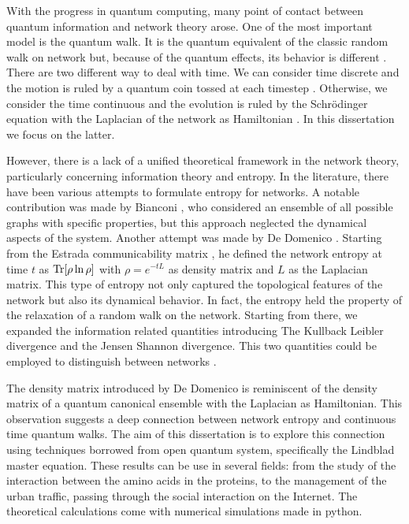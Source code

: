 With the progress in quantum computing, many point of contact between quantum information and network theory arose.
One of the most important model is the quantum walk. It is the quantum equivalent of the classic random walk on network but, because of the quantum effects, its behavior is different \cite{Kempe}. There are two different way to deal with time. We can consider time discrete and the motion is ruled by a quantum coin tossed at each timestep \cite{Coin_quantum_walk}. Otherwise, we consider the time continuous and the evolution is ruled by the Schrödinger equation with the Laplacian of the network as Hamiltonian \cite{Farhi_98}. In this dissertation we focus on the latter.

However, there is a lack of a unified theoretical framework in the network theory, particularly concerning information theory and entropy. 
In the literature, there have been various attempts to formulate entropy for networks. A notable contribution was made by Bianconi \cite{Bianconi_entropy_1,Bianconi_entropy_2}, who considered an ensemble of all possible graphs with specific properties, but this approach neglected the dynamical aspects of the system.
Another attempt was made by De Domenico \cite{De_Domenico_2016}. Starting from the Estrada communicability matrix \cite{Estrada_2008}, he defined the network entropy at time $t$ as $\operatorname{Tr}[\rho \ln \rho]$ with $\rho = e^{-tL}$ as density matrix and $L$ as the Laplacian matrix. This type of entropy not only captured the topological features of the network but also its dynamical behavior. In fact, the entropy held the property of the relaxation of a random walk on the network. Starting from there, we expanded the information related quantities introducing The Kullback Leibler divergence and the Jensen Shannon divergence. This two quantities could be employed to distinguish between networks \cite{multilayer}.

The density matrix introduced by De Domenico is reminiscent of the density matrix of a quantum canonical ensemble with the Laplacian as Hamiltonian. This observation suggests a deep connection between network entropy and continuous time quantum walks.
The aim of this dissertation is to explore this connection using techniques borrowed from open quantum system, specifically the Lindblad master equation. These results can be use in several fields: from the study of the interaction between the amino acids in the proteins, to the management of the urban traffic, passing through the social interaction on the Internet.
The theoretical calculations come with numerical simulations made in python.

